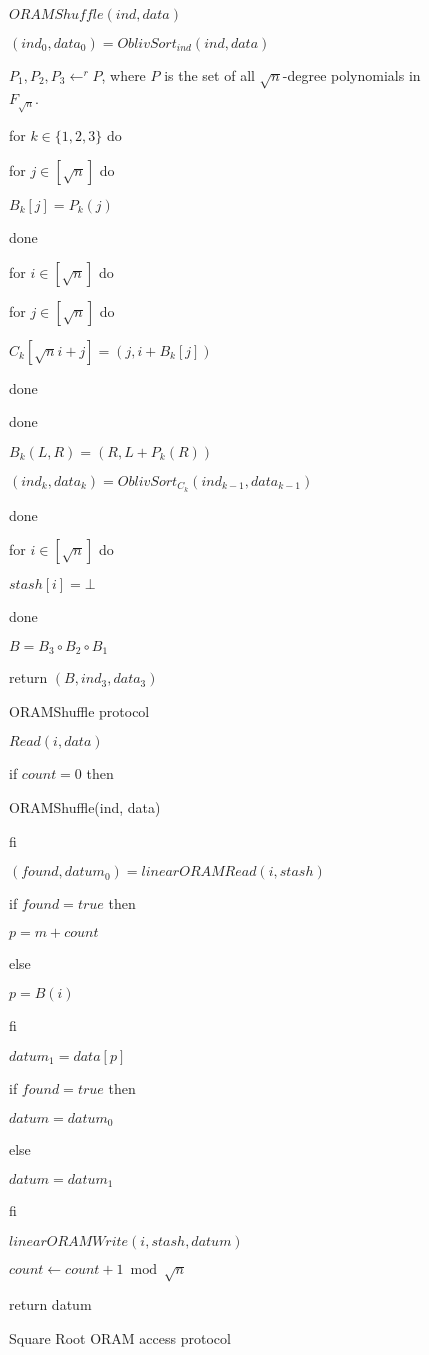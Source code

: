 \begin{figure}
\begin{framed}

$ORAMShuffle(ind, data)$

$(ind_0, data_0) = OblivSort_{ind}(ind, data)$

$P_1, P_2, P_3 \leftarrow^r P$, where $P$ is the set of all $\sqrt{n}$-degree polynomials in $F_{\sqrt{n}}$. 

for $k \in \{1, 2, 3\}$ do

  for $j \in [\sqrt{n}]$ do

    $B_k[j] = P_k(j)$

  done
    
  for $i \in [\sqrt{n}]$ do

    for $j \in [\sqrt{n}]$ do

      $C_k[\sqrt{n} i + j] = (j, i + B_k[j])$

    done

   done

  $B_k (L, R) = (R, L + P_k(R))$

  $(ind_k, data_k) = OblivSort_{C_k}(ind_{k-1}, data_{k-1})$
  
done

for $i \in [\sqrt{n}]$ do

    $stash[i] = \bot$

done


$B = B_3 \circ B_2 \circ B_1$

return $(B, ind_3, data_3)$	

\caption{ORAMShuffle protocol} \label{fig:ORAMShuffle}
\end{framed}
\end{figure}


\begin{figure}
\begin{framed}

$Read(i, data)$

if $count = 0$ then

    ORAMShuffle(ind, data)

fi

$(found, datum_0) = linearORAMRead(i, stash)$

if $found = true$ then

  $p = m + count$

else

  $p = B(i)$

fi

$datum_1 = data[p]$

if $found = true$ then

  $datum = datum_0$

else

  $datum = datum_1$

fi

$linearORAMWrite(i, stash, datum)$

$count \leftarrow count + 1 \bmod \sqrt{n}$ 

return datum

\caption{Square Root ORAM access protocol} \label{fig:sqrtORAMAccess}
\end{framed}
\end{figure}

